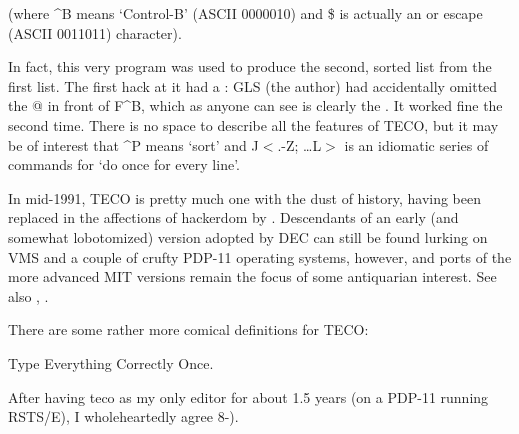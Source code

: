 (where \^{}B means `Control-B' (ASCII 0000010) and \$ is actually an  or escape (ASCII 0011011) character).

In fact, this very program was used to produce the second, sorted list from the first list. The first hack at it had a : GLS
(the author) had accidentally omitted the @ in front of F\^{}B, which as anyone can see is clearly the . It worked
fine the second time. There is no space to describe all the features of TECO, but it may be of interest that \^{}P means `sort' and
J$<$.-Z; \dots L$>$ is an idiomatic series of commands for `do once for every line'.

In mid-1991, TECO is pretty much one with the dust of history, having been replaced in the affections of hackerdom by .
Descendants of an early (and somewhat lobotomized) version adopted by DEC can still be found lurking on VMS and a couple of crufty PDP-11
operating systems, however, and ports of the more advanced MIT versions remain the focus of some antiquarian interest. See also
, .

\begin{new}
	There are some rather more comical definitions for TECO:

	\begin{usenet}

		Type Everything Correctly Once.

		After having teco as my only editor for about 1.5 years (on a PDP-11 running RSTS/E), I wholeheartedly agree 8-).


	\end{usenet}
\end{new}

